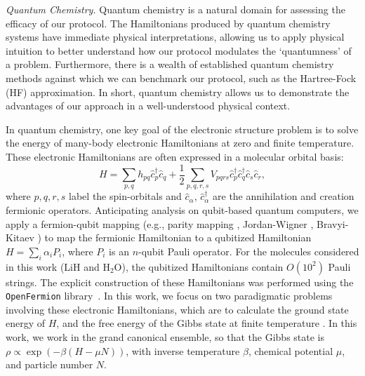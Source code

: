 \documentclass[a4paper,accepted=2024-07-10]{quantumarticle}
\begin{document}
\textit{Quantum Chemistry.} Quantum chemistry is a natural domain for assessing the efficacy of our protocol. The Hamiltonians produced by quantum chemistry systems have immediate physical interpretations, allowing us to apply physical intuition to better understand how our protocol modulates the `quantumness' of a problem. Furthermore, there is a wealth of established quantum chemistry methods against which we can benchmark our protocol, such as the Hartree-Fock (HF) approximation. In short, quantum chemistry allows us to demonstrate the advantages of our approach in a well-understood physical context.

In quantum chemistry, one key goal of the electronic structure problem is to solve the energy of many-body electronic Hamiltonians at zero and finite temperature. These electronic Hamiltonians are often expressed in a molecular orbital basis:
\begin{equation}
    H = \sum_{p,q} h_{pq}\hat{c}^{\dagger}_{p}\hat{c}_{q}+\dfrac{1}{2}\sum_{p,q,r,s}V_{pqrs}\hat{c}^{\dagger}_{p}\hat{c}^{\dagger}_{q}\hat{c}_{s}\hat{c}_{r},\label{eq:second_q}
\end{equation}
where $p,q,r,s$ label the spin-orbitals and $\hat{c}_{\alpha}$, $\hat{c}^{\dagger}_{\alpha}$ are the annihilation and creation fermionic operators. Anticipating analysis on qubit-based quantum computers, we apply a fermion-qubit mapping (e.g., parity mapping \cite{10.1063/1.4768229}, Jordan-Wigner \cite{Jordan:1928wi}, Bravyi-Kitaev \cite{https://doi.org/10.1002/qua.24969}) to  map the fermionic Hamiltonian to a qubitized Hamiltonian $H = \sum_{i}\alpha_i P_i$, where $P_i$ is an $n$-qubit Pauli operator. For the molecules considered in this work (LiH and H$_2$O), the qubitized Hamiltonians contain $O(10^2)$ Pauli strings. The explicit construction of these Hamiltonians was performed using the \texttt{OpenFermion} library~\cite{mcclean2019openfermion}. In this work, we focus on two paradigmatic problems involving these electronic Hamiltonians, which are to calculate the ground state energy of $H$, and the free energy of the Gibbs state at finite temperature \cite{chowdhury2016quantum}. In this work, we work in the grand canonical ensemble, so that the Gibbs state is $\rho \propto \exp(-\beta (H - \mu N))$, with inverse temperature $\beta$, chemical potential $\mu$, and particle number $N$.
\end{document}
